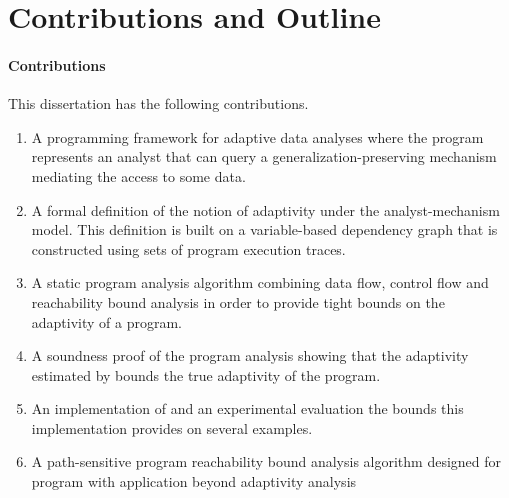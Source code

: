 
\section{Contributions and Outline}
\label{sec:intro-outline}
\paragraph{Contributions}
This dissertation has the following contributions.
\begin{enumerate}
   \item A programming framework for adaptive data analyses where the program represents an analyst that can query a generalization-preserving mechanism mediating the access to some data. 
   \item 
   A formal definition of the notion of adaptivity under the analyst-mechanism model. 
   This definition is built on a variable-based dependency graph that is constructed using sets of program execution traces.
   \item 
   A static program analysis algorithm {\THESYSTEM} combining data flow, control flow and  reachability bound analysis in order to provide tight bounds on the adaptivity of a program. 
   \item A soundness proof of the program analysis showing that the adaptivity estimated by {\THESYSTEM} bounds the true adaptivity of the program. 
   \item An implementation of {\THESYSTEM} and an experimental evaluation the bounds this implementation provides on several examples.
   \item A path-sensitive program reachability bound analysis algorithm designed for program with application beyond adaptivity analysis

\end{enumerate}
